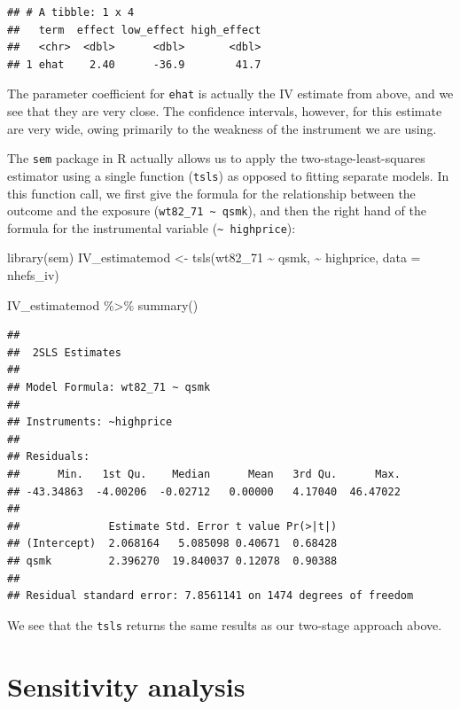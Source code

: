 \documentclass[
]{book}
\newenvironment{Shaded}{\begin{snugshade}}{\end{snugshade}}
\newcommand{\AttributeTok}[1]{\textcolor[rgb]{0.77,0.63,0.00}{#1}}
\newcommand{\FunctionTok}[1]{\textcolor[rgb]{0.00,0.00,0.00}{#1}}
\newcommand{\NormalTok}[1]{#1}
\newcommand{\OtherTok}[1]{\textcolor[rgb]{0.56,0.35,0.01}{#1}}
\newcommand{\SpecialCharTok}[1]{\textcolor[rgb]{0.00,0.00,0.00}{#1}}
\begin{document}
\begin{verbatim}
## # A tibble: 1 x 4
##   term  effect low_effect high_effect
##   <chr>  <dbl>      <dbl>       <dbl>
## 1 ehat    2.40      -36.9        41.7
\end{verbatim}

The parameter coefficient for \texttt{ehat} is actually the IV estimate from above, and we see that they are very close. The confidence intervals, however, for this estimate are very wide, owing primarily to the weakness of the instrument we are using.

The \texttt{sem} package in R actually allows us to apply the two-stage-least-squares estimator using a single function (\texttt{tsls}) as opposed to fitting separate models.
In this function call, we first give the formula for the relationship between
the outcome and the exposure (\texttt{wt82\_71\ \textasciitilde{}\ qsmk}), and then the right hand of the formula for
the instrumental variable (\texttt{\textasciitilde{}\ highprice}):

\begin{Shaded}
\begin{Highlighting}[]
\FunctionTok{library}\NormalTok{(sem)}
\NormalTok{IV\_estimatemod }\OtherTok{\textless{}{-}} \FunctionTok{tsls}\NormalTok{(wt82\_71 }\SpecialCharTok{\textasciitilde{}}\NormalTok{ qsmk, }\SpecialCharTok{\textasciitilde{}}\NormalTok{ highprice, }\AttributeTok{data =}\NormalTok{ nhefs\_iv)}

\NormalTok{IV\_estimatemod }\SpecialCharTok{\%\textgreater{}\%}
  \FunctionTok{summary}\NormalTok{()}
\end{Highlighting}
\end{Shaded}

\begin{verbatim}
## 
##  2SLS Estimates
## 
## Model Formula: wt82_71 ~ qsmk
## 
## Instruments: ~highprice
## 
## Residuals:
##      Min.   1st Qu.    Median      Mean   3rd Qu.      Max. 
## -43.34863  -4.00206  -0.02712   0.00000   4.17040  46.47022 
## 
##              Estimate Std. Error t value Pr(>|t|)
## (Intercept)  2.068164   5.085098 0.40671  0.68428
## qsmk         2.396270  19.840037 0.12078  0.90388
## 
## Residual standard error: 7.8561141 on 1474 degrees of freedom
\end{verbatim}

We see that the \texttt{tsls} returns the same results as our two-stage approach above.

\hypertarget{sensitivity-analysis}{%
\section{Sensitivity analysis}\label{sensitivity-analysis}}
\end{document}
